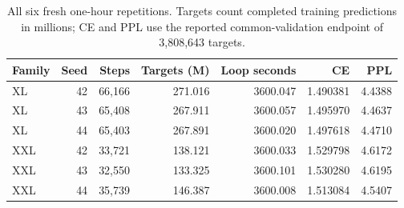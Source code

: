 \begin{table}[t]
\centering\small
\caption{All six fresh one-hour repetitions. Targets count completed training predictions in millions; CE and PPL use the reported common-validation endpoint of 3,808,643 targets.}
\label{tab:allrepetitions}
\begin{tabular}{lrrrrrr}
\toprule
Family & Seed & Steps & Targets (M) & Loop seconds & CE & PPL\\
\midrule
XL & 42 & 66,166 & 271.016 & 3600.047 & 1.490381 & 4.4388\\
XL & 43 & 65,408 & 267.911 & 3600.057 & 1.495970 & 4.4637\\
XL & 44 & 65,403 & 267.891 & 3600.020 & 1.497618 & 4.4710\\
XXL & 42 & 33,721 & 138.121 & 3600.033 & 1.529798 & 4.6172\\
XXL & 43 & 32,550 & 133.325 & 3600.101 & 1.530280 & 4.6195\\
XXL & 44 & 35,739 & 146.387 & 3600.008 & 1.513084 & 4.5407\\
\bottomrule
\end{tabular}
\end{table}
